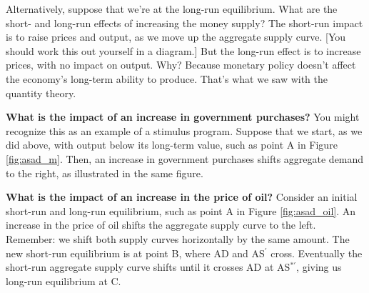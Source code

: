 Alternatively, suppose that we're at the long-run equilibrium.
What are the short- and long-run effects of increasing the
money supply?
The short-run impact is to raise prices and output, as
we move up the aggregate supply curve.
[You should work this out yourself in a diagram.]
But the long-run effect is to increase prices,
with no impact on output.
Why?  Because monetary policy doesn't affect
the economy's long-term ability to produce.
That's what we saw with the quantity theory.

\textbf{What is the impact of an increase in government purchases?}
You might recognize this as an example of a stimulus program.
Suppose that we start, as we did above, with output below
its long-term value,
such as point A in Figure \ref{fig:asad_m}.
Then, an increase in government purchases shifts aggregate demand to the right,
 as illustrated in the same figure.


\textbf{What is the impact of an increase in the price of oil?}
Consider an initial short-run and long-run
equilibrium, such as point A in Figure \ref{fig:asad_oil}.
An increase in the price of oil
shifts the aggregate supply curve to the left.
Remember:  we shift both supply curves horizontally
by the same amount.
The new short-run equilibrium is at point B,
where AD and AS$^{'}$ cross.
Eventually the short-run aggregate supply
 curve shifts until it crosses AD at AS$^{*'}$, giving us long-run equilibrium at C.


